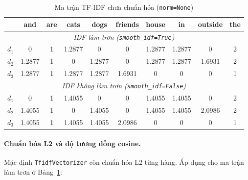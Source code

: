 \begin{table}[H]
\centering
\small
\begin{tabular}{|l|c|c|c|c|c|c|c|c|c|}
\hline
 & and & are & cats & dogs & friends & house & in & outside & the \\
\hline
\multicolumn{10}{|c|}{\textit{IDF làm trơn (\texttt{smooth\_idf=True})}} \\
\hline
$d_1$ & 0 & 1 & 1.2877 & 0 & 0 & 1.2877 & 1.2877 & 0 & 2 \\ \hline
$d_2$ & 1.2877 & 1 & 0 & 1.2877 & 0 & 1.2877 & 1.2877 & 1.6931 & 2 \\ \hline
$d_3$ & 1.2877 & 1 & 1.2877 & 1.2877 & 1.6931 & 0 & 0 & 0 & 1 \\ \hline
\multicolumn{10}{|c|}{\textit{IDF không làm trơn (\texttt{smooth\_idf=False})}} \\
\hline
$d_1$ & 0 & 1 & 1.4055 & 0 & 0 & 1.4055 & 1.4055 & 0 & 2 \\ \hline
$d_2$ & 1.4055 & 1 & 0 & 1.4055 & 0 & 1.4055 & 1.4055 & 2.0986 & 2 \\ \hline
$d_3$ & 1.4055 & 1 & 1.4055 & 1.4055 & 2.0986 & 0 & 0 & 0 & 1 \\ \hline
\end{tabular}
\caption{Ma trận TF-IDF chưa chuẩn hóa (\texttt{norm=None})}
\label{tab:tfidf}
\end{table}



\paragraph{Chuẩn hóa L2 và độ tương đồng cosine.} Mặc định \texttt{TfidfVectorizer} còn chuẩn hóa L2 từng hàng. Áp dụng cho ma trận làm trơn ở Bảng~\ref{tab:tfidf}:

